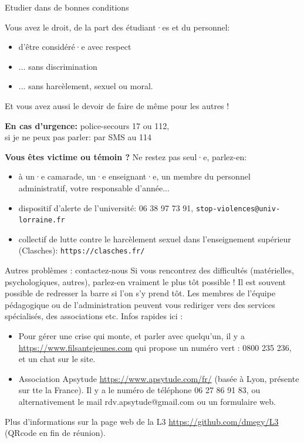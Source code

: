 \documentclass{beamer}
\begin{document}
\begin{frame}{Etudier dans de bonnes conditions}

Vous avez le droit, de la part des étudiant·es et du personnel:
\begin{itemize} 
\item d'être considéré·e avec respect
\item ... sans discrimination
\item ... sans harcèlement, sexuel ou moral.
\end{itemize}
Et vous avez aussi le devoir de faire de même pour les autres !

\medskip
\textbf{En cas d'urgence: } police-secours 17 ou 112, \\
si je ne peux pas parler: par SMS au 114

\medskip
\textbf{Vous êtes victime ou témoin ?} {\color{red}Ne restez pas seul·e, parlez-en:}
\begin{itemize} 
\item à un·e camarade, un·e enseignant·e, un membre du personnel administratif, votre responsable d'année...
\item dispositif d'alerte de l'université: 06 38 97 73 91, {\tt stop-violences@univ-lorraine.fr}
\item collectif de lutte contre le harcèlement sexuel dans l'enseignement supérieur (Clasches):  {\tt https://clasches.fr/}
\end{itemize}

\end{frame}

\begin{frame}
\begin{alertblock}{Autres problèmes : contactez-nous}
Si vous rencontrez des difficultés (matérielles, psychologiques, autres), parlez-en vraiment le plus tôt possible ! Il est souvent possible de redresser la barre si l'on s'y prend tôt. Les membres de l'équipe pédagogique ou de l'administration peuvent vous rediriger vers des services spécialisés, des associations etc. Infos rapides ici : 
\begin{itemize}
\item Pour gérer une crise qui monte, et parler avec quelqu’un, il y a \url{https://www.filsantejeunes.com} qui propose un numéro vert : 0800 235 236, et un chat sur le site.
\item Association Apsytude \url{https://www.apsytude.com/fr/} (basée à Lyon, présente sur tte la France). Il y a le numéro de téléphone 06 27 86 91 83, ou alternativement le mail rdv.apsytude@gmail.com ou un formulaire web.
\end{itemize}

Plus d'informations sur la page web de la L3 \url{https://github.com/dmegy/L3} (QRcode en fin de réunion). 
\end{alertblock}
\end{frame}
\end{document}
